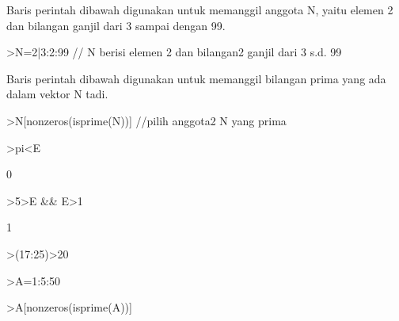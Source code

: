 \documentclass{article}
\begin{document}
\begin{eulernotebook}
\begin{eulercomment}
Baris perintah dibawah digunakan untuk memanggil anggota N, yaitu
elemen 2 dan bilangan ganjil dari 3 sampai dengan 99.
\end{eulercomment}
\begin{eulerprompt}
>N=2|3:2:99 // N berisi elemen 2 dan bilangan2 ganjil dari 3 s.d. 99
\end{eulerprompt}
\begin{euleroutput}
  [2,  3,  5,  7,  9,  11,  13,  15,  17,  19,  21,  23,  25,  27,  29,
  31,  33,  35,  37,  39,  41,  43,  45,  47,  49,  51,  53,  55,  57,
  59,  61,  63,  65,  67,  69,  71,  73,  75,  77,  79,  81,  83,  85,
  87,  89,  91,  93,  95,  97,  99]
\end{euleroutput}
\begin{eulercomment}
Baris perintah dibawah digunakan untuk memanggil bilangan prima yang
ada dalam vektor N tadi.
\end{eulercomment}
\begin{eulerprompt}
>N[nonzeros(isprime(N))] //pilih anggota2 N yang prima
\end{eulerprompt}
\begin{euleroutput}
  [2,  3,  5,  7,  11,  13,  17,  19,  23,  29,  31,  37,  41,  43,  47,
  53,  59,  61,  67,  71,  73,  79,  83,  89,  97]
\end{euleroutput}
\begin{eulerprompt}
>pi<E
\end{eulerprompt}
\begin{euleroutput}
  0
\end{euleroutput}
\begin{eulerprompt}
>5>E && E>1
\end{eulerprompt}
\begin{euleroutput}
  1
\end{euleroutput}
\begin{eulerprompt}
>(17:25)>20
\end{eulerprompt}
\begin{euleroutput}
  [0,  0,  0,  0,  1,  1,  1,  1,  1]
\end{euleroutput}
\begin{eulerprompt}
>A=1:5:50
\end{eulerprompt}
\begin{euleroutput}
  [1,  6,  11,  16,  21,  26,  31,  36,  41,  46]
\end{euleroutput}
\begin{eulerprompt}
>A[nonzeros(isprime(A))]
\end{eulerprompt}

\end{eulernotebook}
\end{document}
